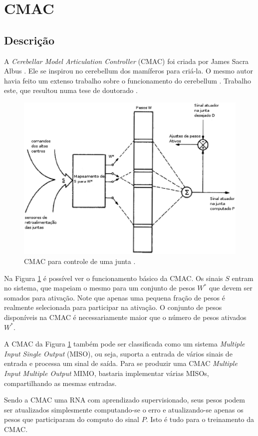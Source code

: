 \section[CMAC]{CMAC}
\subsection[Descrição]{\textbf{Descrição}}

A \emph{Cerebellar Model Articulation Controller} (CMAC) foi criada por James Sacra Albus \cite{Albus1975}. 
Ele se inspirou no cerebellum dos mamíferos para criá-la. 
O mesmo autor havia feito um extenso trabalho sobre o funcionamento do cerebellum \cite{Albus1971}.
Trabalho este, que resultou numa tese de doutorado \cite{Albus1972}.

\begin{figure}[ht]
	\centering
	\includegraphics[width=15 cm]{figuras/cmac1.eps}
	\caption{CMAC para controle de uma junta \cite{Albus1975}.}
    	\label{fig1}
\end{figure}

Na Figura \ref{fig1} é possível ver o funcionamento básico da CMAC. Os sinais $S$ entram no sistema, que mapeiam o mesmo para um conjunto de pesos $W^*$ que devem ser somados para ativação. 
Note que apenas uma pequena fração de pesos é realmente selecionada para participar na ativação. 
O conjunto de pesos disponíveis na CMAC é necessariamente maior que o número de pesos ativados $W^*$. 

A CMAC da Figura \ref{fig1} também pode ser classificada como um sistema \emph{Multiple Input Single Output} (MISO), ou seja, suporta a entrada de vários sinais de entrada e processa um sinal de saída.
Para se produzir uma CMAC \emph{Multiple Input Multiple Output} MIMO, bastaria implementar várias MISOs, compartilhando as mesmas entradas.

Sendo a CMAC uma RNA com aprendizado supervisionado, seus pesos podem ser atualizados simplesmente computando-se o erro e atualizando-se apenas os pesos que participaram do computo do sinal $P$. Isto é tudo para o treinamento da CMAC.

